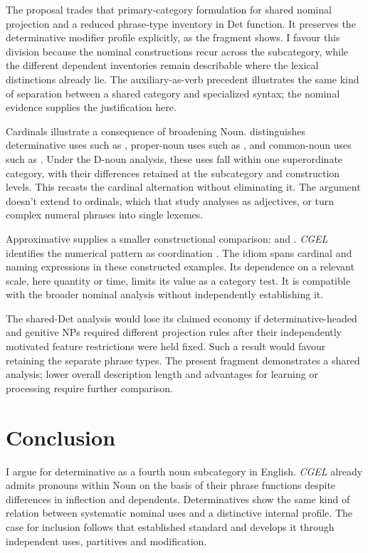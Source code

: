 \documentclass[12pt]{article}
\begin{document}
The proposal trades that primary-category formulation for shared nominal projection and a reduced phrase-type inventory in Det function. It preserves the determinative modifier profile explicitly, as the fragment shows. I favour this division because the nominal constructions recur across the subcategory, while the different dependent inventories remain describable where the lexical distinctions already lie. The auxiliary-as-verb precedent illustrates the same kind of separation between a shared category and specialized syntax; the nominal evidence supplies the justification here.

Cardinals illustrate a consequence of broadening Noun. \textcite{reynolds2026numerals} distinguishes determinative uses such as , proper-noun uses such as , and common-noun uses such as . Under the D-noun analysis, these uses fall within one superordinate category, with their differences retained at the subcategory and construction levels. This recasts the cardinal alternation without eliminating it. The argument doesn't extend to ordinals, which that study analyses as adjectives, or turn complex numeral phrases into single lexemes.

Approximative  supplies a smaller constructional comparison:  and . \textit{CGEL} identifies the numerical pattern as coordination \citep[431, n.~47]{huddleston2002}. The idiom spans cardinal and naming expressions in these constructed examples. Its dependence on a relevant scale, here quantity or time, limits its value as a category test. It is compatible with the broader nominal analysis without independently establishing it.

The shared-Det analysis would lose its claimed economy if determinative-headed and genitive NPs required different projection rules after their independently motivated feature restrictions were held fixed. Such a result would favour retaining the separate phrase types. The present fragment demonstrates a shared analysis; lower overall description length and advantages for learning or processing require further comparison.

\section{Conclusion}\label{sec:conclusion}

I argue for determinative as a fourth noun subcategory in English. \textit{CGEL} already admits pronouns within Noun on the basis of their phrase functions despite differences in inflection and dependents. Determinatives show the same kind of relation between systematic nominal uses and a distinctive internal profile. The case for inclusion follows that established standard and develops it through independent uses, partitives and modification.
\end{document}
